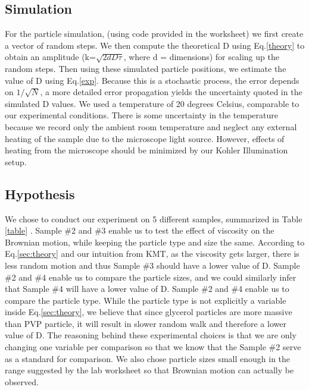 \documentclass[iop,revtex4]{emulateapj_mod}
\begin{document}
\subsection{Simulation}\label{sim}
For the particle simulation,  (using code provided in the worksheet) we first create a vector of random steps. We then compute the theoretical D using Eq.\ref{theory} to obtain an amplitude (k=$\sqrt{2dD\tau}$, where d = dimensions) for scaling up the random steps. Then using these simulated particle positions, we estimate the value of D using Eq.\ref{exp}. Because this is a stochastic process, the error depends on $1/\sqrt{N}$, a more detailed error propagation yields the uncertainty quoted in the simulated D values. We used a temperature of 20 degrees Celsius, comparable to our experimental conditions. There is some uncertainty in the temperature because we record only the ambient room temperature and neglect any external heating of the sample due to the microscope light source. However, effects of heating from the microscope should be minimized by our Kohler Illumination setup.
\subsection{Hypothesis}\label{hypo}
 We chose to conduct our experiment on  5 different samples, summarized in Table  \ref{table} . Sample \#2 and \#3 enable us to test the effect of viscosity on the Brownian motion, while keeping the particle type and size the same. According to Eq.\ref{sec:theory} and our intuition from KMT, as the viscosity gets larger, there is less random motion and thus Sample \#3 should have a lower value of D.  Sample \#2 and \#4 enable us to compare the particle sizes, and we could similarly infer that Sample \#4 will have a lower value of D. Sample \#2 and \#4 enable us to compare the particle type. While the particle type is not explicitly a variable inside Eq.\ref{sec:theory}, we believe that since glycerol particles are more massive than PVP particle, it will result in slower random walk and therefore a lower value of D. The reasoning behind these experimental choices is that we are only changing one variable per comparison so that we know that the Sample \#2  serve as a standard for comparison. We also chose particle sizes small enough in the range suggested by the lab worksheet so that Brownian motion can actually be observed.
\end{document}

